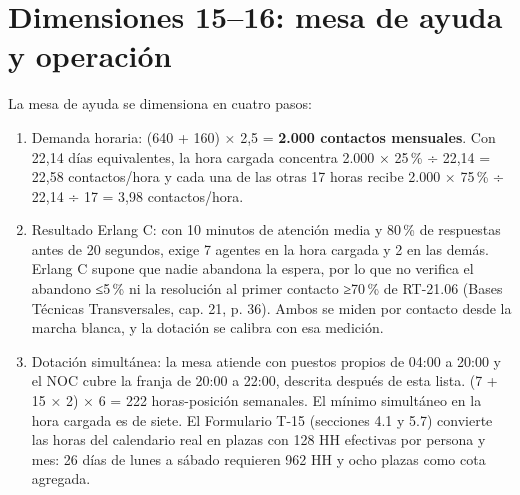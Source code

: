 \section{Dimensiones 15–16: mesa de ayuda y operación}
\label{sec:anexo-4b-dimensiones-15-16}

La mesa de ayuda se dimensiona en cuatro pasos:

\begin{enumerate}
  \item Demanda horaria: (640 + 160) × 2,5 = \textbf{2.000 contactos mensuales}. Con 22,14 días equivalentes, la hora cargada concentra 2.000 × 25\,\% ÷ 22,14 = 22,58 contactos/hora y cada una de las otras 17 horas recibe 2.000 × 75\,\% ÷ 22,14 ÷ 17 = 3,98 contactos/hora.
  \item Resultado Erlang C: con 10 minutos de atención media y 80\,\% de respuestas antes de 20 segundos, exige 7 agentes en la hora cargada y 2 en las demás. Erlang C supone que nadie abandona la espera, por lo que no verifica el abandono ≤5\,\% ni la resolución al primer contacto ≥70\,\% de RT-21.06 (Bases Técnicas Transversales, cap. 21, p. 36). Ambos se miden por contacto desde la marcha blanca, y la dotación se calibra con esa medición.
  \item Dotación simultánea: la mesa atiende con puestos propios de 04:00 a 20:00 y el NOC cubre la franja de 20:00 a 22:00, descrita después de esta lista. (7 + 15 × 2) × 6 = 222 horas-posición semanales. El mínimo simultáneo en la hora cargada es de siete. El Formulario T-15 (secciones 4.1 y 5.7) convierte las horas del calendario real en plazas con 128 HH efectivas por persona y mes: 26 días de lunes a sábado requieren 962 HH y ocho plazas como cota agregada.

\end{enumerate}
